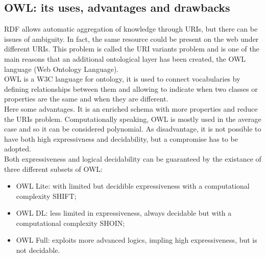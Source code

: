 \subsection{OWL: its uses, advantages and drawbacks}
RDF allows automatic aggregation of knowledge through URIs,
but there can be issues of ambiguity. In fact, the same resource
could be present on the web under different URIs.
This problem is called the URI variants problem and is one of the main
reasons that an additional ontological layer has been created,
the OWL language (Web Ontology Language).\\
OWL is a W3C language for ontology, it is used to connect
vocabularies by defining relationships between them and allowing
to indicate when two classes or properties are the same and when they
are different.\\
Here some advantages. It is an enriched schema with more properties
and reduce the URIs problem. Computationally speaking, OWL is mostly
used in the average case and so it can be considered polynomial.
As disadvantage, it is not possible to have both high expressivness
and decidability, but a compromise has to be adopted.\\
Both expressiveness and logical decidability can be guaranteed
by the existance of three different subsets of OWL:
\begin{itemize}
    \item OWL Lite: with limited but decidible expressiveness with a
    computational complexity SHIFT;
    \item OWL DL: less limited in expressiveness, always decidable but
    with a computational complexity SHOIN;
    \item OWL Full: exploits more advanced logics, impling high
    expressiveness, but is not decidable.
\end{itemize}
